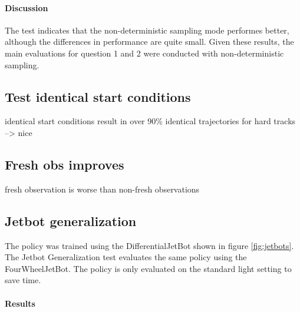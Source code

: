 \paragraph{Discussion}
The test indicates that the non-deterministic sampling mode performes better, although the differences in performance are quite small. Given these results, the main evaluations for question 1 and 2 were conducted with non-deterministic sampling.

\subsection{Test identical start conditions}

identical start conditions result in over 90\% identical trajectories for hard tracks
--> nice

\subsection{Fresh obs improves}

fresh observation is worse than non-fresh observations




\subsection{Jetbot generalization}

The policy was trained using the DifferentialJetBot shown in figure \ref{fig:jetbots}. The Jetbot Generalization test evaluates the same policy using the FourWheelJetBot. The policy is only evaluated on the standard light setting to save time.

\paragraph{Results}

